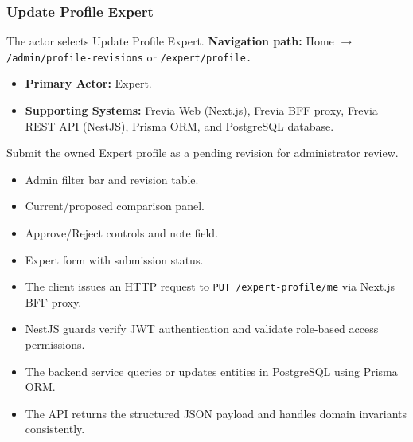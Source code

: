 \subsubsection{Update Profile Expert}

The actor selects Update Profile Expert.\newline
\textbf{Navigation path:} Home $\rightarrow$ \texttt{/\allowbreak{}admin/\allowbreak{}profile-\allowbreak{}revisions} or \texttt{/\allowbreak{}expert/\allowbreak{}profile.}


\begin{itemize}[leftmargin=1.6em,topsep=3pt,itemsep=2pt,parsep=0pt,label=$\bullet$]
    \item \textbf{Primary Actor:} Expert.
    \item \textbf{Supporting Systems:} Frevia Web (Next.js), Frevia BFF proxy, Frevia REST API (NestJS), Prisma ORM, and PostgreSQL database.
\end{itemize}

\noindent Submit the owned Expert profile as a pending revision for administrator review.

\begin{itemize}[leftmargin=1.6em,topsep=3pt,itemsep=2pt,parsep=0pt,label=$\bullet$]
    \item Admin filter bar and revision table.
    \item Current/proposed comparison panel.
    \item Approve/Reject controls and note field.
    \item Expert form with submission status.
\end{itemize}

\begin{itemize}[leftmargin=1.6em,topsep=3pt,itemsep=2pt,parsep=0pt,label=$\bullet$]
    \item The client issues an HTTP request to \texttt{PUT /\allowbreak{}expert-\allowbreak{}profile/\allowbreak{}me} via Next.js BFF proxy.
    \item NestJS guards verify JWT authentication and validate role-based access permissions.
    \item The backend service queries or updates entities in PostgreSQL using Prisma ORM.
    \item The API returns the structured JSON payload and handles domain invariants consistently.
\end{itemize}

